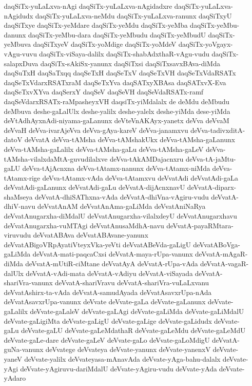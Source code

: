 {daqSiTx-yuLaLxva-nAgi
daqSiTx-yuLaLxva-nAgidadxre
daqSiTx-yuLaLxva-nAgidudx
daqSiTx-yuLaLxva-neMdu
daqSiTx-yuLaLxva-ranunx
daqSiTxyU
daqSiTxye
daqSiTx-yeMdare
daqSiTx-yeMdu
daqSiTx-yeMba
daqSiTx-yeMbu-danunx
daqSiTx-yeMbu-dara
daqSiTx-yeMbudu
daqSiTx-yeMbudU
daqSiTx-yeMbuva
daqSiTxyeV
daqSiTx-yoMdige
daqSiTx-yoMdeV
daqSiTx-yoVgayx-vAgu-vuvu
daqSiTx-viSaya-dalilx
daqSiTx-shabAdxthaR-vAgu-vudu
daqSiTx-salapxDuva
daqSiTx-sAkiSx-yanunx
daqSiTxsi
daqSiTxsavxBAva-diMda
daqSuTxH
daqSaTxqq
daqSeTxH
daqSeTxV
daqSeTxVH
daqSeTxVdaRSATx
daqSeTxVdarxRSATxraM
daqSeTxYva
daqSATxyXBAsa
daqSATxvX-Eva
daqSeTxvXYva
daqSerxY
daqSeV
daqSeVH
daqSeVdaRSATx-ramf
daqSeVdarxRSATx-raMpasheyxVH
daqsiTx-yiMdalalx
de
deMdu
deMbudu
deMbuva
deshe-gaLalUlx
deshe-yalilx
deshe-yalelx
deshe-yiMda
dese-yiMda
deVtAdhAyxnAdi-niyama-gaLanunx
deVteVnAKAyx-yanetx
deVva
deVvaM
deVvaH
deVva-ivarAjeVva
deVva-gAya-kareV
deVva-janamxvu
deVva-tadivxditA-datoV
deVvatA
deVva-tAMsha
deVva-tAMshakUkx
deVva-tAMsha-gaLanunx
deVva-tAMsha-gaLalilx
deVva-tAMsha-gaLu
deVva-tAMsha-gaLeV
deVva-tAMsha-vilalxdaMtA-guvudilalxve
deVva-tAkAMDajacnxru
deVva-tA-jaMtu-gaLU
deVva-tAjAcnxna
deVva-tAtamx-nanunx
deVva-tAtamx-niMda
deVva-tAtamx-rige
deVva-tAtamx-vAda
deVva-tAtamxvu
deVvatAdi
deVvatAdi-gaLa
deVvatAdi-gaLanunx
deVvatAdi-gaLu
deVvatA-dijAcnxnavU
deVvatA-diparx-shaMseya
deVvatA-dhiSAThxna-vAda
deVvatA-dhiVna-vAgiru-vudu
deVvatA-dhiV-navu
deVvatAnAM
deVvatAnAma-gaLiMda
deVvatAniNaRya
deVvatAnugarxha-diMdalU
deVvatAnugarxha-vilalxdeyU
deVvatAnugarxhavu
deVvatAnugarxha-vuMTAgi
deVvatAnusaMdhA-navu
deVvatA-payaRMtara-viruvudu
deVvatABAva
deVvatABAvane-yanunx
deVvatABigoVRpAyatiVteyxVka-yeVti
deVvatABeVda-gaLigU
deVvatABoVga-gaLiMda
deVvatA-mati-paqcaCxsi
deVvatA-maya-rUpa-vanunx
deVvatA-mAgaR-diMda
deVvatA-mUtiR-ciMtane
deVvatAyA
deVvatA-rUpa-vAda
deVvatA-vagaR-dalUlx
deVvatA-vAdi-mata
deVvatA-vAdiyu
deVvatA-viSayada
deVvatA-shariVra-vanunx
deVvatA-shariVravu
deVvatA-shariVra-vuLaLxvanu
deVvatAshirx-ta-vAda
deVvatA-samudAyada
deVvatAsavxrUpa-nAda
deVvatAsavxrUpa-vanunx
deVvate
deVvate-gaLa
deVvate-gaLanunx
deVvate-gaLalilx
deVvate-gaLaleV
deVvate-gaLAgi
deVvate-gaLiMda
deVvate-gaLiMdalU
deVvate-gaLigiMta
deVvate-gaLigU
deVvate-gaLige
deVvate-gaLidudx
deVvate-gaLu
deVvate-gaLU
deVvate-gaLeMdathaR
deVvate-gaLeMdu
deVvate-gaLeMdU
deVvate-gaLe-dare
deVvate-gaLeV
deVvate-gaLo
deVvate-gaLoMdigU
deVvatA-guNa-vanunx
deVvatege
deVvateya
deVvate-yanunx
deVvate-yanenxV
deVvate-yaneV
deVvate-yalilx
deVvateyasa-mAnavAda
deVvate-yAga-bahu-dalalx
deVvate-yAgi
deVvate-yAgiruvu-dariMdalU
deVvate-yAgiru-vudu
deVvate-yAda
deVvate-yAdaro
}
